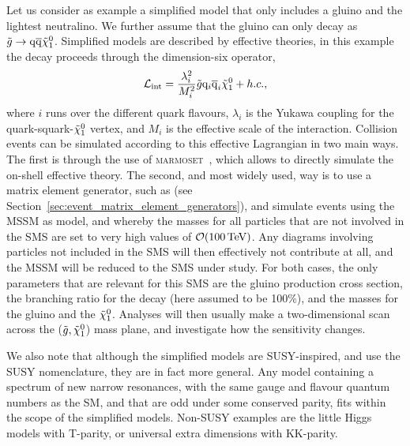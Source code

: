 Let us consider as example a simplified model that only includes a gluino and the lightest
neutralino. We further assume that the gluino can only decay as $\tilde{g}\rightarrow \mathrm{q} \overline{\mathrm{q}}
\tilde{\chi}_1^0$. Simplified models are described by effective theories, in this example the decay
proceeds through the dimension-six operator, 
\begin{equation}
  \mathcal{L}_{\text{int}} = \frac{\lambda_i^2}{M_i^2} \tilde{g} \mathrm{q}_i \overline{\mathrm{q}}_i \tilde{\chi}_1^0 + h.c. , 
\end{equation}
where $i$ runs over the different quark flavours, $\lambda_i$ is the Yukawa coupling for the
quark-squark-$\tilde{\chi}_1^0$ vertex, and $M_i$ is the effective scale of the interaction. 
Collision events can be simulated according to this effective Lagrangian in two main ways. The
first is through the use of \textsc{marmoset}~\cite{ArkaniHamed:2007fw}, which allows to directly
simulate the on-shell effective theory. The second, and most widely used, way is to use a matrix
element generator, such as \MADGRAPH (see Section~\ref{sec:event_matrix_element_generators}), and
simulate events using the MSSM as model, and whereby the masses for all particles that are not
involved in the SMS are set to very high values of $\mathcal{O}(100\,\text{Te\hspace{-.08em}V})$.
Any diagrams involving particles not included in the SMS will then effectively not contribute at
all, and the MSSM will be reduced to the SMS under study.  
For both cases, the only parameters that are relevant for this SMS are the gluino production cross
section, the branching ratio for the decay (here assumed to be 100\%), and the masses for the gluino
and the $\tilde{\chi}_1^0$. Analyses will then usually make a two-dimensional scan across the
($\tilde{g},\tilde{\chi}_1^0$) mass plane, and investigate how the sensitivity changes.


We also note that although the simplified models are SUSY-inspired, and use the SUSY nomenclature,
they are in fact more general. Any model containing a spectrum of new narrow resonances, with the
same gauge and flavour quantum numbers as the SM, and that are odd under some conserved parity, fits
within the scope of the simplified models. Non-SUSY examples are the little Higgs models with
T-parity, or universal extra dimensions with KK-parity. 



 